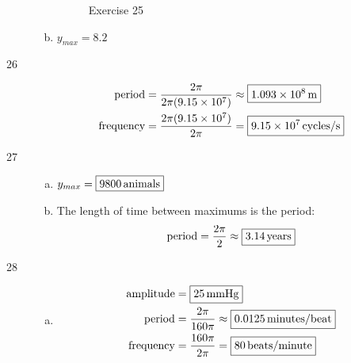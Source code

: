\documentclass{exam}
\begin{document}
\begin{description}
\begin{enumerate}[(a)]
\begin{figure}[H]
              Exercise 25
            \end{figure}

          \item $y_{max} = \boxed{ 8.2 }$

        \end{enumerate}

      \item[26]
        \begin{align*}
          \text{period}    & = \frac{2 \pi}{2 \pi (9.15 \times 10^7)} \approx \boxed{ \unit[1.093 \times 10^8]{m} } \\
          \text{frequency} & = \frac{2 \pi (9.15 \times 10^7)}{2 \pi} = \boxed{ \unit[9.15 \times 10^7]{cycles/s} } \\
        \end{align*}

      \item[27]
        \pagebreak
        \begin{enumerate}[(a)]
          \item $y_{max} = \boxed{ \unit[9800]{animals} }$

          \item The length of time between maximums is the period:
            \[
              \text{period} = \frac{2 \pi}{2} \approx \boxed{ \unit[3.14]{years} } \\
            \]
        \end{enumerate}

      \item[28]
        \begin{enumerate}[(a)]
          \item 
            \begin{align*}
              \text{amplitude} & = \boxed{ \unit[25]{mmHg} } \\
              \text{period}    & = \frac{2 \pi}{160 \pi} \approx \boxed{ \unit[0.0125]{minutes/beat} } \\
              \text{frequency} & = \frac{160 \pi}{2 \pi} = \boxed{ \unit[80]{beats/minute} } \\
            \end{align*}


\end{enumerate}
\end{description}
\end{document}
